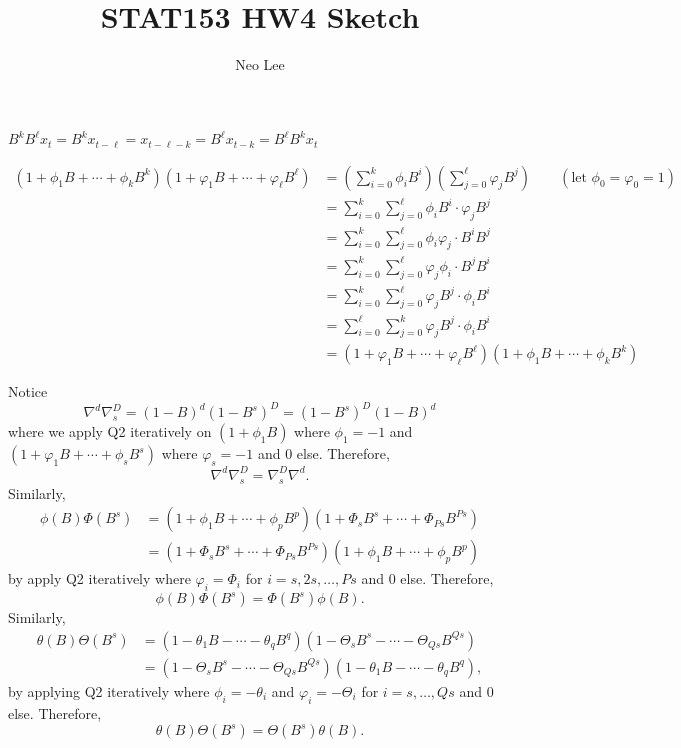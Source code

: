 \documentclass{article}
\title{STAT153 HW4 Sketch}
\author{Neo Lee}
\date{}
\begin{document}
 

\maketitle 

$B^kB^\ell x_t = B^kx_{t-\ell} = x_{t-\ell-k} = B^\ell x_{t-k}=B^\ell B^kx_t$

\begin{align*}
    (1 + \phi_1 B + \cdots + \phi_k B^k) (1 + \varphi_1 B + \cdots + \varphi_\ell B^\ell) & = 
    \left(\sum_{i=0}^{k}\phi_i B^i\right) \left(\sum_{j=0}^{\ell}\varphi_j B^j\right) \qquad (\text{let }\phi_0=\varphi_0=1)\\
    & = \sum_{i=0}^{k}\sum_{j=0}^{\ell}\phi_i B^i \cdot \varphi_j B^j \\
    & = \sum_{i=0}^{k}\sum_{j=0}^{\ell}\phi_i\varphi_j \cdot B^i  B^j \\
    & = \sum_{i=0}^{k}\sum_{j=0}^{\ell}\varphi_j\phi_i \cdot B^j  B^i \\
    & = \sum_{i=0}^{k}\sum_{j=0}^{\ell}\varphi_j B^j \cdot \phi_i B^i \\
    & = \sum_{i=0}^{\ell}\sum_{j=0}^{k}\varphi_j B^j \cdot \phi_i B^i \\
    & = (1 + \varphi_1 B + \cdots + \varphi_\ell B^\ell)(1 + \phi_1 B + \cdots + \phi_k B^k) 
\end{align*}

Notice $$\nabla^d\nabla_s^D = (1-B)^d(1-B^s)^D = (1-B^s)^D(1-B)^d$$ where we apply Q2 iteratively on 
$(1+\phi_1 B)$ where $\phi_1 = -1$ and $(1+\varphi_1B + \cdots + \phi_s B^s)$ where $\varphi_s = -1$
and 0 else. 
Therefore, $$\nabla^d\nabla_s^D = \nabla_s^D\nabla^d.$$ Similarly, 
\begin{align*}
    \phi(B)\Phi(B^s)& =(1+\phi_1B + \cdots + \phi_pB^p)(1+\Phi_sB^s +\cdots+ \Phi_{Ps}B^{Ps})\\
    & =(1+\Phi_sB^s +\cdots+ \Phi_{Ps}B^{Ps})(1+\phi_1B + \cdots + \phi_pB^p)
\end{align*}
by apply Q2 iteratively where $\varphi_i = \Phi_i$ for $i=s, 2s, \dots, Ps$ and 0 else. Therefore,
$$\phi(B)\Phi(B^s) = \Phi(B^s)\phi(B).$$
Similarly,
\begin{align*}
    \theta(B)\Theta(B^s)& =(1-\theta_1B - \cdots - \theta_qB^q)(1-\Theta_sB^s -\cdots- \Theta_{Qs}B^{Qs})\\
    & =(1-\Theta_sB^s -\cdots- \Theta_{Qs}B^{Qs})(1-\theta_1B - \cdots - \theta_qB^q),
\end{align*}
by applying Q2 iteratively where $\phi_i = -\theta_i$ and $\varphi_i=-\Theta_i$ for $i=s,\dots,Qs$
and 0 else. Therefore,
$$\theta(B)\Theta(B^s) = \Theta(B^s)\theta(B).$$
\end{document}
